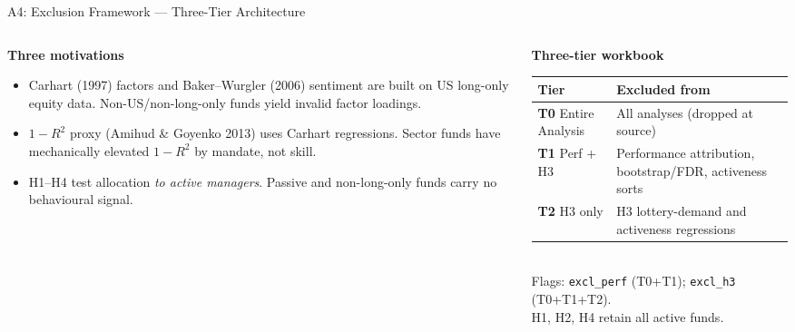 \documentclass[10pt, aspectratio=169]{beamer}
\begin{document}
\begin{frame}{A4: Exclusion Framework — Three-Tier Architecture}
  \begin{columns}[T]
    \begin{column}{0.50\textwidth}
      \small\textbf{Three motivations}
      \begin{itemize}\itemsep2pt
        \item Carhart (1997) factors and Baker--Wurgler (2006) sentiment are built
              on US long-only equity data. Non-US/non-long-only funds yield invalid
              factor loadings.
        \item $1-R^2$ proxy (Amihud \& Goyenko 2013) uses Carhart regressions.
              Sector funds have mechanically elevated $1-R^2$ by mandate, not skill.
        \item H1--H4 test allocation \emph{to active managers}. Passive and
              non-long-only funds carry no behavioural signal.
      \end{itemize}
    \end{column}
    \begin{column}{0.47\textwidth}
      \small\textbf{Three-tier workbook}
      \vspace{3pt}\\
      \scriptsize
      \begin{tabular}{lp{3.8cm}}
        \toprule
        Tier & Excluded from \\
        \midrule
        \textbf{T0} Entire Analysis & All analyses (dropped at source) \\[2pt]
        \textbf{T1} Perf + H3 & Performance attribution, bootstrap/FDR, activeness sorts \\[2pt]
        \textbf{T2} H3 only & H3 lottery-demand and activeness regressions \\
        \bottomrule
      \end{tabular}
      \vspace{4pt}\\
      \footnotesize Flags: \texttt{excl\_perf} (T0+T1);
      \texttt{excl\_h3} (T0+T1+T2).\\
      H1, H2, H4 retain all active funds.
    \end{column}
  \end{columns}
\end{frame}
\end{document}
